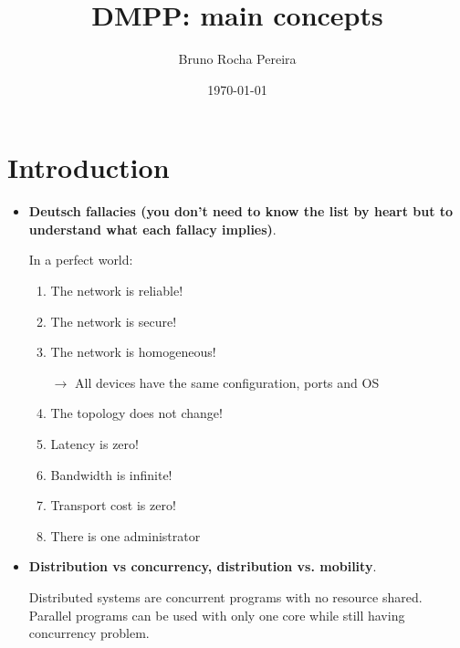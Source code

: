 \documentclass[a4paper]{report}
\title{DMPP: main concepts}
\author{Bruno Rocha Pereira}
\date{\today}
\begin{document}
\maketitle
\chapter{Introduction}
\begin{itemize}
  \item \textbf{Deutsch fallacies (you don’t need to know the list by heart but to understand what
  each fallacy implies)}.
  
  In a perfect world:
  \begin{enumerate}
	\item The network is reliable!
    \item The network is secure!
    \item The network is homogeneous!
    
	$\rightarrow $ All devices have the same configuration, ports and OS
    \item The topology does not change!
    \item Latency is zero!
    \item Bandwidth is infinite!
    \item Transport cost is zero!
    \item There is one administrator
\end{enumerate}
  \item \textbf{Distribution vs concurrency, distribution vs. mobility}.

  Distributed systems are concurrent programs with no resource shared. Parallel programs can be used with only one core while still having  concurrency problem.


\end{itemize}
\end{document}
